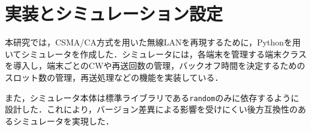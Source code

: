 \documentclass[a4paper, 10pt]{ltjsarticle}
\begin{document}

\section{実装とシミュレーション設定}

本研究では，CSMA/CA方式を用いた無線LANを再現するために，Pythonを用いてシミュレータを作成した．シミュレータには，各端末を管理する端末クラスを導入し，端末ごとのCWや再送回数の管理，バックオフ時間を決定するためのスロット数の管理，再送処理などの機能を実装している．

また，シミュレータ本体は標準ライブラリである\texttt{random}のみに依存するように設計した．これにより，バージョン差異による影響を受けにくい後方互換性のあるシミュレータを実現した．



\end{document}
